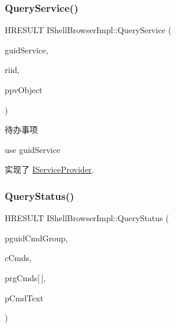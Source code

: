\mbox{\label{struct_i_shell_browser_impl_ab25e872ce1179ccc7dd65a09820a2b6f}} 
\subsubsection{\texorpdfstring{Query\+Service()}{QueryService()}}
{\footnotesize\ttfamily H\+R\+E\+S\+U\+LT I\+Shell\+Browser\+Impl\+::\+Query\+Service (\begin{DoxyParamCaption}\item[{\hyperlink{struct___g_u_i_d}{R\+E\+F\+G\+U\+ID}}]{guid\+Service,  }\item[{R\+E\+F\+I\+ID}]{riid,  }\item[{\hyperlink{interfacevoid}{void} $\ast$$\ast$}]{ppv\+Object }\end{DoxyParamCaption})\hspace{0.3cm}{\ttfamily [virtual]}}

\begin{DoxyRefDesc}{待办事项}
\item[\hyperlink{todo__todo000079}{待办事项}]use guid\+Service \end{DoxyRefDesc}


实现了 \hyperlink{interface_i_service_provider}{I\+Service\+Provider}.

\mbox{\label{struct_i_shell_browser_impl_ab19313e52966de6bb5a99bccd7c4a61c}} 
\subsubsection{\texorpdfstring{Query\+Status()}{QueryStatus()}}
{\footnotesize\ttfamily H\+R\+E\+S\+U\+LT I\+Shell\+Browser\+Impl\+::\+Query\+Status (\begin{DoxyParamCaption}\item[{const \hyperlink{interface_g_u_i_d}{G\+U\+ID} $\ast$}]{pguid\+Cmd\+Group,  }\item[{U\+L\+O\+NG}]{c\+Cmds,  }\item[{\hyperlink{struct_i_ole_command_target_1_1__tag_o_l_e_c_m_d}{O\+L\+E\+C\+MD}}]{prg\+Cmds\mbox{[}$\,$\mbox{]},  }\item[{\hyperlink{struct_i_ole_command_target_1_1__tag_o_l_e_c_m_d_t_e_x_t}{O\+L\+E\+C\+M\+D\+T\+E\+XT} $\ast$}]{p\+Cmd\+Text }\end{DoxyParamCaption})\hspace{0.3cm}{\ttfamily [virtual]}}

